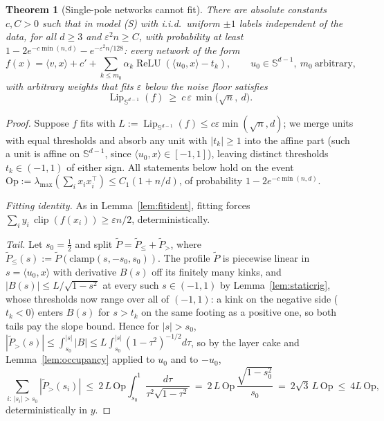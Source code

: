 \documentclass[11pt,reqno]{amsart}
\theoremstyle{plain}
\newtheorem{theorem}{Theorem}[section]
\theoremstyle{definition}
\theoremstyle{remark}
\newcommand{\Sd}{\mathbb{S}^{d-1}}
\newcommand{\eps}{\varepsilon}
\newcommand{\Lip}{\operatorname{Lip}}
\newcommand{\relu}{\operatorname{ReLU}}
\newcommand{\inn}[2]{\langle #1,#2\rangle}
\DeclareMathOperator{\clip}{clip}
\begin{document}
\begin{theorem}[Single-pole networks cannot fit]\label{thm:singlecluster}
There are absolute constants $c,C>0$ such that in model (S) with i.i.d.\ uniform $\pm1$ labels independent of the data, for all $d\ge3$ and $\eps^2n\ge C$, with probability at least $1-2e^{-c\min(n,d)}-e^{-\eps^2n/128}$: every network of the form
\[
f(x)=\inn vx+c'+\sum_{k\le m_0}\alpha_k\relu(\inn{u_0}x-t_k),\qquad u_0\in\Sd,\ m_0\ \text{arbitrary},
\]
with arbitrary weights that fits $\eps$ below the noise floor satisfies
\[
\Lip_{\Sd}(f)\ \ge\ c\,\eps\,\min\bigl(\sqrt n,\ d\bigr).
\]
\end{theorem}
\begin{proof}[Proof]
Suppose $f$ fits with $L:=\Lip_{\Sd}(f)\le c\eps\min(\sqrt n,d)$; we merge units with equal thresholds and absorb any unit with $|t_k|\ge1$ into the affine part (such a unit is affine on $\Sd$, since $\inn{u_0}x\in[-1,1]$), leaving distinct thresholds $t_k\in(-1,1)$ of either sign. All statements below hold on the event $\mathrm{Op}:=\lambda_{\max}(\sum_ix_ix_i^\top)\le C_1(1+n/d)$, of probability $1-2e^{-c\min(n,d)}$.

\emph{Fitting identity.} As in Lemma~\ref{lem:fitident}, fitting forces $\sum_iy_i\,\clip(f(x_i))\ge\eps n/2$, deterministically.

\emph{Tail.} Let $s_0=\tfrac12$ and split $\tilde P=\tilde P_{\le}+\tilde P_>$, where $\tilde P_{\le}(s):=\tilde P(\mathrm{clamp}(s,-s_0,s_0))$. The profile $\tilde P$ is piecewise linear in $s=\inn{u_0}x$ with derivative $B(s)$ off its finitely many kinks, and $|B(s)|\le L/\sqrt{1-s^2}$ at every such $s\in(-1,1)$ by Lemma~\ref{lem:staticrig}, whose thresholds now range over all of $(-1,1)$: a kink on the negative side ($t_k<0$) enters $B(s)$ for $s>t_k$ on the same footing as a positive one, so both tails pay the slope bound. Hence for $|s|>s_0$, $|\tilde P_>(s)|\le\int_{s_0}^{|s|}|B|\le L\int_{s_0}^{|s|}(1-\tau^2)^{-1/2}d\tau$, so by the layer cake and Lemma~\ref{lem:occupancy} applied to $u_0$ and to $-u_0$,
\[
\sum_{i:\,|s_i|>s_0}|\tilde P_>(s_i)|\ \le\ 2\,L\,\mathrm{Op}\int_{s_0}^1\frac{d\tau}{\tau^2\sqrt{1-\tau^2}}\ =\ 2\,L\,\mathrm{Op}\,\frac{\sqrt{1-s_0^2}}{s_0}\ =\ 2\sqrt3\,L\,\mathrm{Op}\ \le\ 4L\,\mathrm{Op},
\]
deterministically in $y$.


\end{proof}
\end{document}
